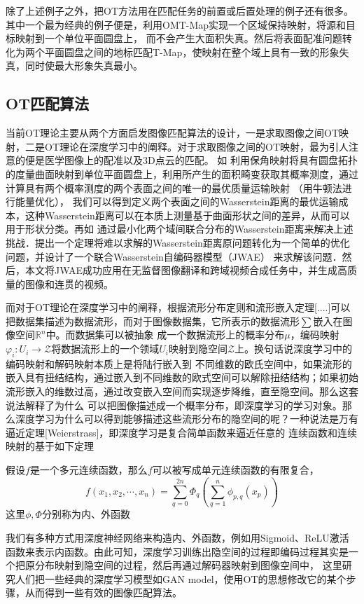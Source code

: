 除了上述例子之外，把OT方法用在匹配任务的前置或后置处理的例子还有很多。其中一个最为经典的例子便是\cite{ma2017robust}，利用OMT-Map实现一个区域保持映射，将源和目标映射到一个单位平面圆盘上，
而不会产生大面积失真。然后将表面配准问题转化为两个平面圆盘之间的地标匹配T-Map，使映射在整个域上具有一致的形象失真，同时使最大形象失真最小。

\subsection{OT匹配算法}

当前OT理论主要从两个方面启发图像匹配算法的设计，一是求取图像之间OT映射，二是OT理论在深度学习中的阐释。对于求取图像之间的OT映射，最为引人注意的便是医学图像上的配准以及3D点云的匹配。
如\cite{su2015optimal} 利用保角映射将具有圆盘拓扑的度量曲面映射到单位平面圆盘上，利用所产生的面积畸变获取其概率测度，通过计算具有两个概率测度的两个表面之间的唯一的最优质量运输映射
（用牛顿法进行能量优化）， 我们可以得到定义两个表面之间的Wasserstein距离的最优运输成本，这种Wasserstein距离可以在本质上测量基于曲面形状之间的差异，从而可以用于形状分类。再如\cite{RN1}
通过最小化两个域间联合分布的Wasserstein距离来解决上述挑战．提出一个定理将难以求解的Wasserstein距离原问题转化为一个简单的优化问题，并设计了一个联合Wasserstein自编码器模型（JWAE）
来求解该问题．然后，本文将JWAE成功应用在无监督图像翻译和跨域视频合成任务中，并生成高质量的图像和连贯的视频。

而对于OT理论在深度学习中的阐释，根据流形分布定则和流形嵌入定理[....]可以把数据集描述为数据流形，而对于图像数据集，它所表示的数据流形$\sum$嵌入在图像空间$\mathbb{R}^n$中。而数据集可以被抽象
成一个数据流形上的概率分布$\mu$，编码映射$\varphi_i : U_i \to \mathcal{Z}$将数据流形上的一个领域$U_i$映射到隐空间$\mathcal{Z}$上。换句话说深度学习中的编码映射和解码映射本质上是将陆行嵌入到
不同维数的欧氏空间中，如果流形的嵌入具有扭结结构，通过嵌入到不同维数的欧式空间可以解除扭结结构；如果初始流形嵌入的维数过高，通过改变嵌入空间而实现逐步降维，直至隐空间。那么这套说法解释了为什么
可以把图像描述成一个概率分布，即深度学习的学习对象。那么深度学习为什么可以得到能够描述这些流形分布的隐空间的呢？一种说法是万有逼近定理[Weierstrass]，即深度学习是复合简单函数来逼近任意的
连续函数和连续映射的基于如下定理
\begin{theorem}\label{theorem:Kolmogorov-Arnold}
    假设$f$是一个多元连续函数，那么$f$可以被写成单元连续函数的有限复合，
    \begin{equation*}\label{function:Kolmogorov-Arnold}
        f(x_1,x_2, \cdots, x_n) = \sum_{q=0}^{2n} \Phi _q \left ( \sum _{q=1}^n \phi_{p,q}(x_p)  \right ) 
    \end{equation*}
    这里$\phi , \Phi$分别称为内、外函数
\end{theorem}
我们有多种方式用深度神经网络来构造内、外函数，例如用Sigmoid、ReLU激活函数来表示内函数。由此可知，深度学习训练出隐空间的过程即编码过程其实是一个把原分布映射到隐空间的过程，然后再通过解码器映射到图像空间中，
这里研究人们把一些经典的深度学习模型如GAN model，使用OT的思想修改它的某个步骤，从而得到一些有效的图像匹配算法。

